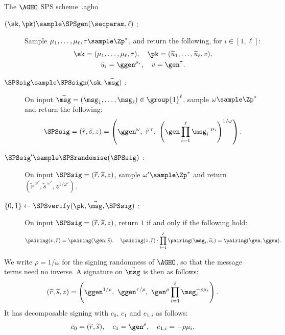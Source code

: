 \begin{primitivebox}{The $\AGHO$ SPS scheme~\cite{C:AGHO11}.}{agho}

  \begin{description}

    \item[$(\sk, \pk) \sample \SPSgen(\secparam, \ell)$ :] Sample $\mu_1,
\ldots, \mu_\ell, \tau \sample \Zp^*$, and return the following, for $i \in [1,\ell]$:
      \begin{gather*}
	\sk = (\mu_1, \ldots, \mu_\ell, \tau), \quad \pk = (\widetilde{u}_1,
\ldots, \widetilde{u}_\ell, v), \\
	\widetilde{u}_i = \ggen^{\mu_i}, \quad v = \gen^{\tau}.
      \end{gather*}

    \item[$\SPSsig \sample \SPSsign(\sk, \vec{\msg})$ :] On input $\vec{\msg} =
(\msg_1, \ldots, \msg_\ell) \in \group{1}^\ell$, sample $\omega \sample \Zp^*$
and return the following:
      \begin{equation*}
	\SPSsig = (\widetilde{r}, \widetilde{s}, z) = \left(\ggen^{\omega}, \
\widetilde{r}^{\,\tau}, \ \left(\gen \prod_{i=1}^{\ell}
\msg_i^{-\mu_i}\right)^{1/\omega}\right).
      \end{equation*}

    \item[$\SPSsig' \sample \SPSrandomise(\SPSsig)$ :] On input $\SPSsig =
(\widetilde{r}, \widetilde{s}, z)$, sample $\omega' \sample \Zp^*$ and return
$(\widetilde{r}^{\,\omega'}, \widetilde{s}^{\,\omega'}, z^{1/\omega'})$.

    \item[$\{0,1\} \leftarrow \SPSverify(\pk, \vec{\msg}, \SPSsig)$ :] On input
$\SPSsig = (\widetilde{r}, \widetilde{s}, z)$, return $1$ if and only if the
following hold:
      \begin{equation*}
	\pairing(v, \widetilde{r}) = \pairing(\gen, \widetilde{s}), \quad
\pairing(z, \widetilde{r}) \cdot \prod_{i=1}^{\ell} \pairing(\msg_i, \widetilde{u}_i)
= \pairing(\gen, \ggen).
      \end{equation*}

  \end{description}

\end{primitivebox}

We write $\rho =
1/\omega$ for the signing randomness of $\AGHO$, so that the message terms need
no inverse. A signature on $\vec{\msg}$ is then as
follows:
%
\begin{equation*}
%
  (\widetilde{r}, \widetilde{s}, z) = \left(\ggen^{1/\rho}, \
\ggen^{\tau/\rho}, \ \gen^{\rho} \prod_{i=1}^{\ell} \msg_i^{-\rho\mu_i}\right).
%
\end{equation*}
%
It has decomposable signing with $c_0$, $c_1$ and $e_{1,i}$ as follows:
%
\begin{equation*}
%
  c_0 = (\widetilde{r}, \widetilde{s}), \quad c_1 = \gen^{\rho}, \quad e_{1,i}
= -\rho\mu_i.
%
\end{equation*}

